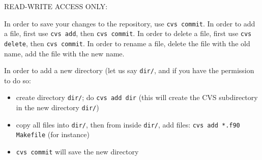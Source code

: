 \documentclass[12pt,a4paper]{article}
\begin{document}
READ-WRITE ACCESS ONLY:

In order to save your changes to the repository, use
{\tt cvs commit}. In order to add a file, first use
{\tt cvs add}, then {\tt cvs commit}. In order to delete
a file, first use {\tt cvs delete}, then {\tt cvs commit}.
In order to rename a file, delete the file with the old
name, add the file with the new name.

In order to add a new directory (let us say {\tt dir/}, 
and if you have the permission to do so:
\begin{itemize}
\item create directory {\tt dir/}; do {\tt cvs add dir} (this
will create the CVS subdirectory in the new directory {\tt dir/})
\item 
copy all files into {\tt dir/}, then from inside {\tt dir/}, add files:
{\tt cvs add *.f90 Makefile} (for instance)
\item
{\tt cvs commit} will save the new directory
\end{itemize}
\end{document}
